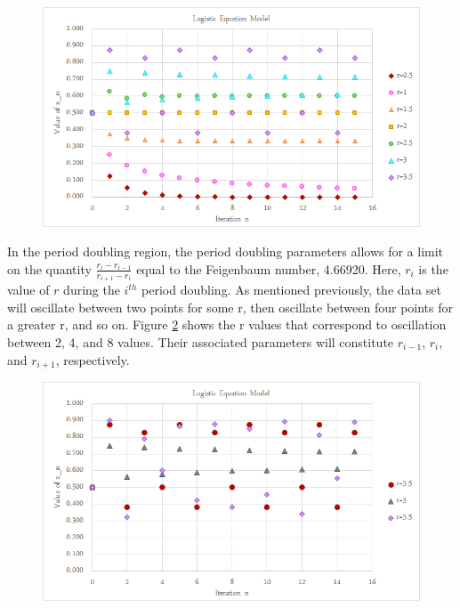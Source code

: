 \documentclass[a4paper]{article}
\begin{document}
\begin{figure}[H]
\centering
\includegraphics[width=1\textwidth]{pdoub.png}
\label{pdoub1}
\end{figure}

In the period doubling region, the period doubling parameters allows for a limit on the quantity $\frac{r_i - r_{i-1}}{r_{i+1} - r_i}$ equal to the Feigenbaum number, 4.66920. Here, $r_i$ is the value of $r$ during the $i^{th}$ period doubling. As mentioned previously, the data set will oscillate between two points for some r, then oscillate between four points for a greater r, and so on. Figure \ref{fein} shows the r values that correspond to oscillation between 2, 4, and 8 values. Their associated parameters will constitute $r_{i-1}$, $r_i$, and $r_{i+1}$, respectively.

\newpage

\begin{figure}[H]
\centering
\includegraphics[width=1\textwidth]{fein.png}
\label{fein}
\end{figure}
\end{document}
